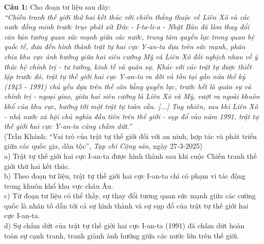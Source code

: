 \documentclass[12pt,a4paper]{article}
\begin{document}
\noindent \textbf{Câu 1:} Cho đoạn tư liệu sau đây:\\
\textit{``Chiến tranh thế giới thứ hai kết thúc với chiến thắng thuộc về Liên Xô và các nước đồng minh trước trục phát xít Đức - I-ta-li-a - Nhật Bản đã làm thay đổi căn bản tương quan sức mạnh giữa các nước, trung tâm quyền lực trong quan hệ quốc tế, đưa đến hình thành trật tự hai cực Y-an-ta dựa trên sức mạnh, phân chia khu vực ảnh hưởng giữa hai siêu cường Mỹ và Liên Xô đối nghịch nhau về ý thức hệ chính trị - tư tưởng, kinh tế và quân sự. Khác với các trật tự được thiết lập trước đó, trật tự thế giới hai cực Y-an-ta ra đời và tồn tại gần nửa thế kỷ (1945 - 1991) chủ yếu dựa trên thế cân bằng quyền lực, trước hết là quân sự và chính trị - ngoại giao, giữa hai siêu cường là Liên Xô và Mỹ, vượt ra ngoài khuôn khổ của khu vực, hướng tới một trật tự toàn cầu. [...] Tuy nhiên, sau khi Liên Xô - nhà nước xã hội chủ nghĩa đầu tiên trên thế giới - sụp đổ vào năm 1991, trật tự thế giới hai cực Y-an-ta cũng chấm dứt.''}\\
\hspace*{\fill}(Trần Khánh: ``Vai trò của trật tự thế giới đối với an ninh, hợp tác và phát triển giữa các quốc gia, dân tộc'', \textit{Tạp chí Cộng sản}, ngày 27-3-2025)\\
\noindent a) Trật tự thế giới hai cực I-an-ta được hình thành sau khi cuộc Chiến tranh thế giới thứ hai kết thúc.\\


\noindent b) Theo đoạn tư liệu, trật tự thế giới hai cực I-an-ta chỉ có phạm vi tác động trong khuôn khổ khu vực châu Âu.\\


\noindent c) Từ đoạn tư liệu có thể thấy, sự thay đổi tương quan sức mạnh giữa các cường quốc là nhân tố dẫn tới cả sự hình thành và sự sụp đổ của trật tự thế giới hai cực I-an-ta.\\


\noindent d) Sự chấm dứt của trật tự thế giới hai cực I-an-ta (1991) đã chấm dứt hoàn toàn sự cạnh tranh, tranh giành ảnh hưởng giữa các nước lớn trên thế giới.
\end{document}
